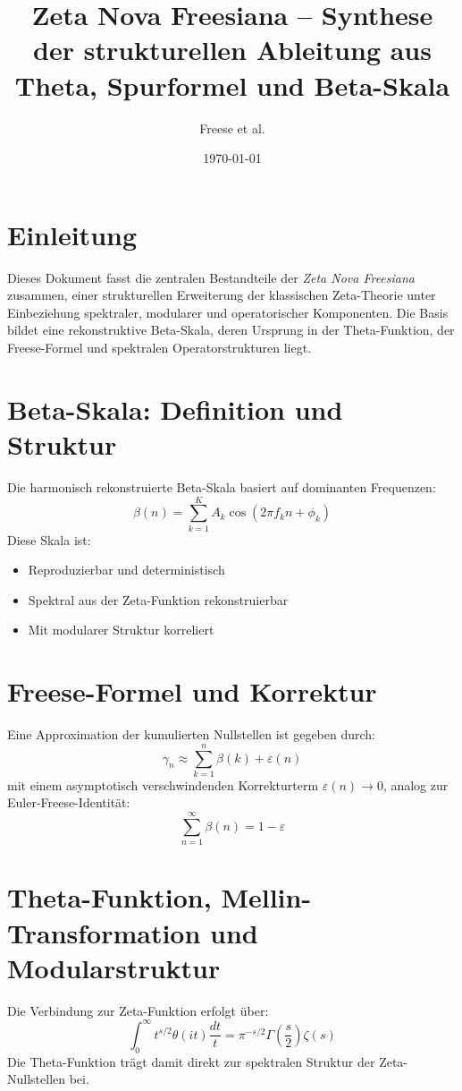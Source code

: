 \documentclass[12pt]{article}
\title{\textbf{Zeta Nova Freesiana – Synthese der strukturellen Ableitung aus \\Theta, Spurformel und Beta-Skala}}
\author{Freese et al.}
\date{\today}
\begin{document}
\maketitle

\section{Einleitung}
Dieses Dokument fasst die zentralen Bestandteile der \textit{Zeta Nova Freesiana} zusammen, einer strukturellen Erweiterung der klassischen Zeta-Theorie unter Einbeziehung spektraler, modularer und operatorischer Komponenten. Die Basis bildet eine rekonstruktive Beta-Skala, deren Ursprung in der Theta-Funktion, der Freese-Formel und spektralen Operatorstrukturen liegt.

\section{Beta-Skala: Definition und Struktur}
Die harmonisch rekonstruierte Beta-Skala basiert auf dominanten Frequenzen:
\[
\beta(n) = \sum_{k=1}^K A_k \cos(2\pi f_k n + \phi_k)
\]
Diese Skala ist:
\begin{itemize}
    \item Reproduzierbar und deterministisch
    \item Spektral aus der Zeta-Funktion rekonstruierbar
    \item Mit modularer Struktur korreliert
\end{itemize}

\section{Freese-Formel und Korrektur}
Eine Approximation der kumulierten Nullstellen ist gegeben durch:
\[
\gamma_n \approx \sum_{k=1}^n \beta(k) + \varepsilon(n)
\]
mit einem asymptotisch verschwindenden Korrekturterm \( \varepsilon(n) \to 0 \), analog zur Euler-Freese-Identität:
\[
\sum_{n=1}^\infty \beta(n) = 1 - \varepsilon
\]

\section{Theta-Funktion, Mellin-Transformation und Modularstruktur}
Die Verbindung zur Zeta-Funktion erfolgt über:
\[
\int_0^\infty t^{s/2} \theta(it) \frac{dt}{t} = \pi^{-s/2} \Gamma\left( \frac{s}{2} \right) \zeta(s)
\]
Die Theta-Funktion trägt damit direkt zur spektralen Struktur der Zeta-Nullstellen bei.
\end{document}
